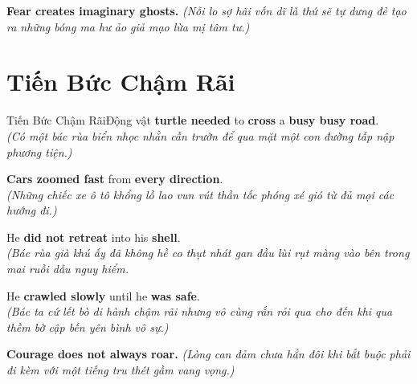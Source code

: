 \begin{baihoc}
  \textbf{Fear creates imaginary ghosts.} \textit{(Nỗi lo sợ hãi vốn dĩ là thứ sẽ tự dưng đẻ tạo ra những bóng ma hư ảo giả mạo lừa mị tâm tư.)}
\end{baihoc}

\vspace{0.8cm}

\ngayDay{}
\section{Tiến Bức Chậm Rãi}
\begin{truyen}{Tiến Bức Chậm Rãi}{Động vật}
 \textbf{turtle needed} to \textbf{cross} a \textbf{busy busy road}.\\
\textit{(Có một bác rùa biển nhọc nhằn cần trườn để qua mặt một con đường tấp nập phương tiện.)}

\textbf{Cars zoomed fast} from \textbf{every direction}.\\
\textit{(Những chiếc xe ô tô khổng lồ lao vun vút thần tốc phóng xé gió từ đủ mọi các hướng đi.)}

He \textbf{did not retreat} into his \textbf{shell}.\\
\textit{(Bác rùa già khú ấy đã không hề co thụt nhát gan đầu lùi rụt màng vào bên trong mai ruồi dẫu nguy hiểm.}

He \textbf{crawled slowly} until he \textbf{was safe}.\\
\textit{(Bác ta cứ lết bò di hành chậm rãi nhưng vô cùng rắn rỏi qua cho đến khi qua thềm bờ cập bến yên bình vô sự.)}
\end{truyen}

\begin{baihoc}
  \textbf{Courage does not always roar.} \textit{(Lòng can đảm chưa hẳn đôi khi bắt buộc phải đi kèm với một tiếng tru thét gầm vang vọng.)}
\end{baihoc}

\vspace{0.8cm}

\ngayDay{}
